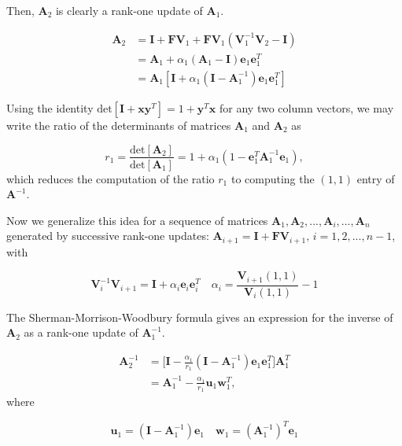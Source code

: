 \documentclass[10pt, twocolumn, twoside]{article}
\begin{document}
Then, $\bm A_2$ is clearly a rank-one update of $\bm A_1$.

\begin{equation*}
\begin{split}
\bm A_2 &= \bm I + \bm F \bm V_1 + \bm F \bm V_1 ( \bm V_1^{-1} \bm V_2 - \bm I ) \\
&= \bm A_1 + \alpha_1 ( \bm A_1 - \bm I ) \bm e_1 \bm e_1^T \\
&= \bm A_1 [ \bm I + \alpha_1 ( \bm I - \bm A_1^{-1} )\bm e_1 \bm e_1^T ]
\end{split}
\end{equation*}

Using the identity $\text{det}[\bm I + \bm x \bm y^T] = 1 + \bm y^T \bm x$ for any two column vectors, we may write the ratio of the determinants of matrices $\bm A_1$ and $\bm A_2$ as

\begin{equation}\label{eq:efRatio}
r_1 = \frac{\text{det}[\bm A_2]}{\text{det}[\bm A_1]} = 1 + \alpha_1 ( 1 - \bm e_1^T \bm A_1^{-1} \bm e_1 ) ,
\end{equation}
which reduces the computation of the ratio $r_1$ to computing the $(1,1)$ entry of $\bm A^{-1}$.

Now we generalize this idea for a sequence of matrices $\bm A_1, \bm A_2, ..., \bm A_i, ..., \bm A_n$ generated by successive rank-one updates: $\bm A_{i+1} = \bm I + \bm F \bm V_{i+1}, \, i = 1, 2, ..., n-1$, with

\begin{equation}
\bm V_i^{-1} \bm V_{i+1} = \bm I + \alpha_i \bm e_i \bm e_i^T \quad \alpha_i = \frac{\bm V_{i+1}(1,1)}{\bm V_i (1,1)} -1
\end{equation}

The Sherman-Morrison-Woodbury formula gives an expression for the inverse of $\bm A_2$ as a rank-one update of $\bm A_1^{-1}$.

\begin{equation}
\begin{split}
\bm A_2^{-1} &= \bigg[ \bm I - \frac{\alpha_1}{r_1} ( \bm I - \bm A_1^{-1} ) \bm e_1 \bm e_1^T  \bigg] \bm A_1^T \\
&= \bm A_1^{-1} - \frac{\alpha_1}{r_1} \bm u_1 \bm w_1^T ,
\end{split}
\end{equation}
where

\begin{equation*}
\bm u_1 = (\bm I - \bm A_1^{-1} ) \bm e_1 \quad \bm w_1 = (\bm A_1^{-1})^T \bm e_1
\end{equation*}
\end{document}
